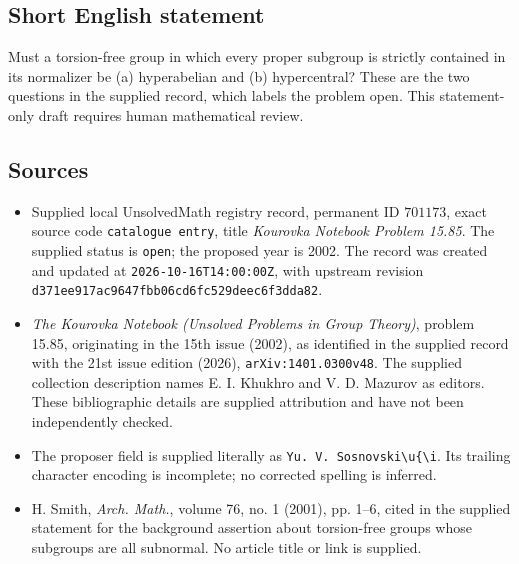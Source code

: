 \documentclass[11pt]{article}
\begin{document}
\subsection{Short English statement}
Must a torsion-free group in which every proper subgroup is strictly contained in its normalizer be (a) hyperabelian and (b) hypercentral? These are the two questions in the supplied record, which labels the problem open. This statement-only draft requires human mathematical review.
\subsection{Sources}
\begin{itemize}
\item Supplied local UnsolvedMath registry record, permanent ID \(701173\), exact source code \texttt{catalogue entry}, title \emph{Kourovka Notebook Problem 15.85}. The supplied status is \texttt{open}; the proposed year is 2002. The record was created and updated at \texttt{2026-10-16T14:00:00Z}, with upstream revision \texttt{d371ee917ac9647fbb06cd6fc529deec6f3dda82}.
\item \emph{The Kourovka Notebook (Unsolved Problems in Group Theory)}, problem 15.85, originating in the 15th issue (2002), as identified in the supplied record with the 21st issue edition (2026), \texttt{arXiv:1401.0300v48}. The supplied collection description names E. I. Khukhro and V. D. Mazurov as editors. These bibliographic details are supplied attribution and have not been independently checked.
\item The proposer field is supplied literally as \texttt{Yu. V. Sosnovski\textbackslash{}u\{\textbackslash{}i}. Its trailing character encoding is incomplete; no corrected spelling is inferred.
\item H. Smith, \emph{Arch. Math.}, volume 76, no. 1 (2001), pp. 1--6, cited in the supplied statement for the background assertion about torsion-free groups whose subgroups are all subnormal. No article title or link is supplied.
\end{itemize}
\end{document}
